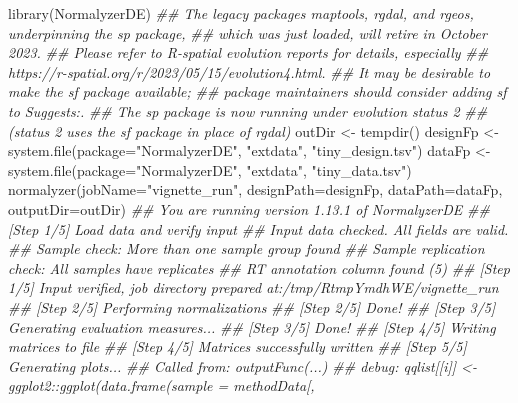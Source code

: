 \documentclass[]{article}
\newcommand{\hlstr}[1]{\textcolor[rgb]{0.251,0.627,0.251}{#1}}%
\newcommand{\hlcom}[1]{\textcolor[rgb]{0.502,0.502,0.502}{\textit{#1}}}%
\newcommand{\hlstd}[1]{\textcolor[rgb]{0.251,0.251,0.251}{#1}}%
\newenvironment{Shaded}{\begin{myshaded}}{\end{myshaded}}
\newcommand{\StringTok}[1]{\hlstr{#1}}
\newcommand{\DocumentationTok}[1]{\hlcom{#1}}
\newcommand{\OtherTok}[1]{{#1}}
\newcommand{\FunctionTok}[1]{\hlstd{#1}}
\newcommand{\AttributeTok}[1]{{#1}}
\newcommand{\NormalTok}[1]{\hlstd{#1}}
\begin{document}
\begin{Shaded}
\begin{Highlighting}[]
\FunctionTok{library}\NormalTok{(NormalyzerDE)}
\DocumentationTok{\#\# The legacy packages maptools, rgdal, and rgeos, underpinning the sp package,}
\DocumentationTok{\#\# which was just loaded, will retire in October 2023.}
\DocumentationTok{\#\# Please refer to R{-}spatial evolution reports for details, especially}
\DocumentationTok{\#\# https://r{-}spatial.org/r/2023/05/15/evolution4.html.}
\DocumentationTok{\#\# It may be desirable to make the sf package available;}
\DocumentationTok{\#\# package maintainers should consider adding sf to Suggests:.}
\DocumentationTok{\#\# The sp package is now running under evolution status 2}
\DocumentationTok{\#\#      (status 2 uses the sf package in place of rgdal)}
\NormalTok{outDir }\OtherTok{\textless{}{-}} \FunctionTok{tempdir}\NormalTok{()}
\NormalTok{designFp }\OtherTok{\textless{}{-}} \FunctionTok{system.file}\NormalTok{(}\AttributeTok{package=}\StringTok{"NormalyzerDE"}\NormalTok{, }\StringTok{"extdata"}\NormalTok{, }\StringTok{"tiny\_design.tsv"}\NormalTok{)}
\NormalTok{dataFp }\OtherTok{\textless{}{-}} \FunctionTok{system.file}\NormalTok{(}\AttributeTok{package=}\StringTok{"NormalyzerDE"}\NormalTok{, }\StringTok{"extdata"}\NormalTok{, }\StringTok{"tiny\_data.tsv"}\NormalTok{)}
\FunctionTok{normalyzer}\NormalTok{(}\AttributeTok{jobName=}\StringTok{"vignette\_run"}\NormalTok{, }\AttributeTok{designPath=}\NormalTok{designFp, }\AttributeTok{dataPath=}\NormalTok{dataFp, }
           \AttributeTok{outputDir=}\NormalTok{outDir)}
\DocumentationTok{\#\# You are running version 1.13.1 of NormalyzerDE}
\DocumentationTok{\#\# [Step 1/5] Load data and verify input}
\DocumentationTok{\#\# Input data checked. All fields are valid.}
\DocumentationTok{\#\# Sample check: More than one sample group found}
\DocumentationTok{\#\# Sample replication check: All samples have replicates}
\DocumentationTok{\#\# RT annotation column found (5)}
\DocumentationTok{\#\# [Step 1/5] Input verified, job directory prepared at:/tmp/RtmpYmdhWE/vignette\_run}
\DocumentationTok{\#\# [Step 2/5] Performing normalizations}
\DocumentationTok{\#\# [Step 2/5] Done!}
\DocumentationTok{\#\# [Step 3/5] Generating evaluation measures...}
\DocumentationTok{\#\# [Step 3/5] Done!}
\DocumentationTok{\#\# [Step 4/5] Writing matrices to file}
\DocumentationTok{\#\# [Step 4/5] Matrices successfully written}
\DocumentationTok{\#\# [Step 5/5] Generating plots...}
\DocumentationTok{\#\# Called from: outputFunc(...)}
\DocumentationTok{\#\# debug: qqlist[[i]] \textless{}{-} ggplot2::ggplot(data.frame(sample = methodData[, }

\end{Highlighting}
\end{Shaded}
\end{document}
